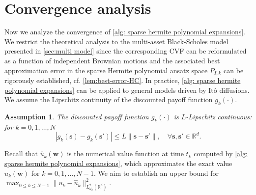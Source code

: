 \documentclass[10pt,a4paper]{amsart}
\numberwithin{equation}{section}
\numberwithin{algorithm}{section}
\theoremstyle{plain}
\newtheorem{assumption}[assumption]{Assumption}
\theoremstyle{remark}
\newcommand{\R}{\mathbb{R}}
\begin{document}
\section{Convergence analysis} \label{sec:convergence}
Now we analyze the convergence of \cref{alg: sparse hermite polynomial expansions}. 
We restrict the theoretical analysis to the multi-asset Black-Scholes model presented in \cref{sec:multi model} since the corresponding CVF can be reformulated as a function of independent Brownian motions and the associated best approximation error in the sparse Hermite polynomial ansatz space $P_{I,k}$ can be rigorously established, cf.  \cref{lem:best-error-HC}. In practice, \cref{alg: sparse hermite polynomial expansions} can be applied to general models driven by It\^{o} diffusions.  
We assume the Lipschitz continuity of the discounted payoff function $g_k(\cdot)$.
\begin{assumption}\label{assu:lip}
    The discounted payoff function $g_k(\cdot)$ is $L$-Lipschitz continuous: for  $k = 0,1,\dots,N$
    \begin{equation} \label{eq: Lipschitz assum}
        |g_k(\mathbf{s}) - g_k(\mathbf{s}')| \le L\|\mathbf{s} - \mathbf{s}'\|, \quad \forall \mathbf{s}, \mathbf{s}' \in \R^d.
    \end{equation}
\end{assumption}
Recall that $\hat{u}_{k}(\mathbf{w})$ is the numerical value function at time $t_k$ computed by \cref{alg: sparse hermite polynomial expansions}, which approximates the exact value ${u}_{k}(\mathbf{w})$ for $k = 0,1,\dots,N-1$. We aim to establish an upper bound for
$\max_{0\le k\le N-1} \|u_k -\hat{u}_k\|_{{L}^2_{\omega_k}(\R^d)}^2$.
\end{document}
